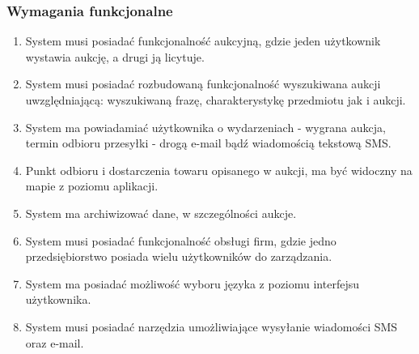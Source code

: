 \documentclass[10pt,titlepage]{article} %
\begin{document}
\subsubsection{Wymagania funkcjonalne}
\begin{enumerate}[1.]
\item System musi posiadać funkcjonalność aukcyjną, gdzie jeden użytkownik wystawia aukcję, a drugi ją licytuje.
\item System musi posiadać rozbudowaną funkcjonalność wyszukiwana aukcji uwzględniającą: wyszukiwaną frazę, charakterystykę przedmiotu jak i aukcji.
\item System ma powiadamiać użytkownika o wydarzeniach - wygrana aukcja, termin odbioru przesyłki - drogą e-mail bądź wiadomością tekstową SMS.
\item Punkt odbioru i dostarczenia towaru opisanego w aukcji, ma być widoczny na mapie z poziomu aplikacji.
\item System ma archiwizować dane, w szczególności aukcje.
\item System musi posiadać funkcjonalność obsługi firm, gdzie jedno przedsiębiorstwo posiada wielu użytkowników do zarządzania.
\item System ma posiadać możliwość wyboru języka z poziomu interfejsu użytkownika.
\item System musi posiadać narzędzia umożliwiające wysyłanie wiadomości SMS oraz e-mail.

\end{enumerate}
\end{document}
